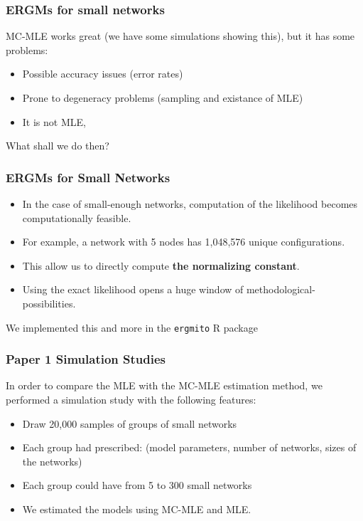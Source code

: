 \documentclass[aspectratio=169, 10pt]{beamer}\usepackage[]{graphicx}\usepackage[]{color}
\newcommand{\ergmitopkg}[0]{\texttt{ergmito}}
\begin{document}
\begin{frame}
\frametitle{ERGMs for small networks}

MC-MLE works great (we have some simulations showing this), but it has some
problems:\pause

\begin{itemize}[<+->]
\item Possible accuracy issues (error rates)
\item Prone to degeneracy problems (sampling and existance of MLE)
\item It is not MLE,
\end{itemize}

What shall we do then?

\end{frame}

\begin{frame}[label=ergmito]
\frametitle{ERGMs for Small Networks}

\pause
\begin{itemize}[<+->]
\item In the case of small-enough networks, computation of the likelihood becomes
computationally feasible.
\item For example, a network with 5 nodes has 1,048,576
unique configurations.
\item This allow us to directly compute {\bf\color{normconst} the normalizing constant}.
\item Using the exact likelihood opens a huge window of methodological-possibilities.
\end{itemize}\pause
We implemented this and more in the \ergmitopkg{} R package \hyperlink{ergmitopkg}{}
\end{frame}

\begin{frame}
\frametitle{Paper 1 Simulation Studies}

In order to compare the MLE with the MC-MLE estimation method, we performed a simulation study with the following features:\pause

\begin{itemize}[<+->]
\item Draw 20,000 samples of groups of small networks
\item Each group had prescribed: (model parameters, number of networks, sizes of the networks)
\item Each group could have from 5 to 300 small networks
\item We estimated the models using MC-MLE and MLE.
\end{itemize}

\end{frame}
\end{document}

